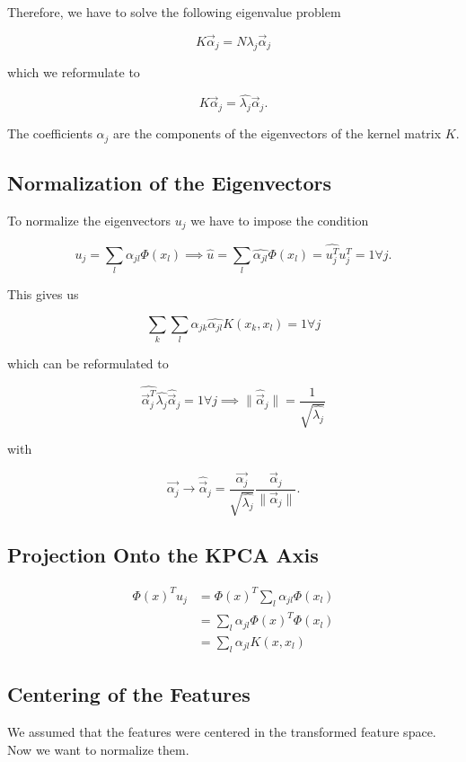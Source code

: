 Therefore, we have to solve the following eigenvalue problem

\[
	K \vec{\alpha}_j = N \lambda_j \vec{\alpha}_j
\]

which we reformulate to

\[
	K \vec{\alpha}_j = \hat{\lambda_j}\vec{\alpha}_j.
\]

The coefficients \(\alpha_j\) are the components of the eigenvectors of the kernel matrix \(K\).

\subsection{Normalization of the Eigenvectors}

To normalize the eigenvectors \(u_j\) we have to impose the condition

\[
	u_j = \sum_{l} \alpha_{jl} \Phi(x_l) \implies \hat{u} = \sum_{l} \hat{\alpha_{jl}} \Phi(x_l) = \hat{u_j^T} u_j^T = 1 \forall j.
\]

This gives us

\[
	\sum_k \sum_l \hat{\alpha_{jk}} \hat{\alpha_{jl}} K(x_k, x_l) = 1 \forall j
\]

which can be reformulated to

\[
	\hat{\vec{\alpha}_j^T} \hat{\lambda_j} \hat{\vec{\alpha}}_j = 1 \forall j \implies \|\hat{\vec{\alpha}}_j\| = \frac{1}{\sqrt{\hat{\lambda_j}}}
\]

with

\[
	\vec{\alpha_j} \to \hat{\vec{\alpha}}_j = \frac{\vec{\alpha_j}}{\sqrt{\hat{\lambda_j}}} \frac{\vec{\alpha}_j}{\|\vec{\alpha}_j\|}.
\]

\subsection{Projection Onto the KPCA Axis}

\begin{align*}
	\Phi(x)^T u_j & = \Phi(x)^T \sum_{l} \alpha_{jl} \Phi(x_l) \\
	              & = \sum_{l} \alpha_{jl} \Phi(x)^T \Phi(x_l) \\
	              & = \sum_{l} \alpha_{jl} K(x, x_l)
\end{align*}

\subsection{Centering of the Features}

We assumed that the features were centered in the transformed feature space. Now we want to normalize them.

